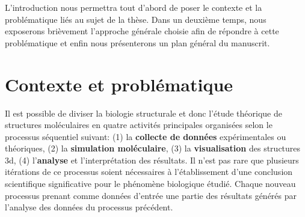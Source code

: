 


L'introduction nous permettra tout d'abord de poser le contexte et la problématique liés au sujet de la thèse. Dans un deuxième temps, nous exposerons brièvement l'approche générale choisie afin de répondre à cette problématique et enfin nous présenterons un plan général du manuscrit.

\section*{Contexte et problématique}

Il est possible de diviser la biologie structurale et donc l'étude théorique de structures moléculaires en quatre activités principales organisées selon le processus séquentiel suivant: (1) la \textbf{collecte de données} expérimentales ou théoriques, (2) la \textbf{simulation moléculaire}, (3) la \textbf{visualisation} des structures 3d, (4) l’\textbf{analyse} et l’interprétation des résultats. Il n'est pas rare que plusieurs itérations de ce processus soient nécessaires à l'établissement d'une conclusion scientifique significative pour le phénomène biologique étudié. Chaque nouveau processus prenant comme données d'entrée une partie des résultats générés par l'analyse des données du processus précédent.  

